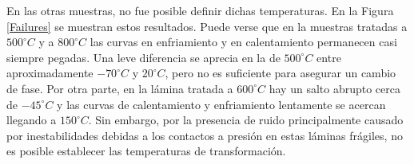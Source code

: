 \documentclass[12pt]{article}
\theoremstyle{definition}
\theoremstyle{remark}
\begin{document}
{En las otras muestras, no fue posible definir dichas temperaturas. En la Figura \ref{Failures} se muestran estos resultados. Puede verse que en la muestras tratadas a $500 ^\circ C$ y a $800 ^\circ C$ las curvas en enfriamiento y en calentamiento permanecen casi siempre pegadas. Una leve diferencia se aprecia en la de  $500 ^\circ C$ entre aproximadamente $-70 ^\circ C$ y $20 ^\circ C$, pero no es suficiente para asegurar un cambio de fase. Por otra parte, en la lámina tratada a $600 ^\circ C$ hay un salto abrupto cerca de  $-45 ^\circ C$ y las curvas de calentamiento y enfriamiento lentamente se acercan llegando a $150 ^\circ C$. Sin embargo, por la presencia de ruido principalmente causado por inestabilidades debidas a los contactos a presión en estas láminas frágiles, no es posible establecer las temperaturas de transformación.

}
\end{document}
